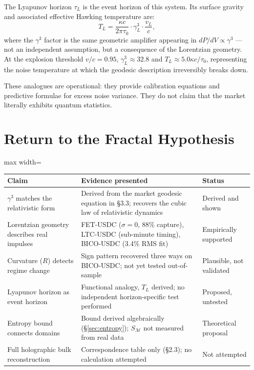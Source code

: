 \documentclass[12pt,a4paper]{article}
\begin{document}
The Lyapunov horizon $\tau_L$ is the event horizon of this system. Its
surface gravity and associated effective Hawking temperature are:
\begin{equation}
    T_L = \frac{\kappa c}{2\pi\tau_0}\cdot\gamma_L^3\cdot\frac{v_L}{c},
\end{equation}
where the $\gamma^3$ factor is the same geometric amplifier appearing in
$dP/dV\propto\gamma^3$ --- not an independent assumption, but a
consequence of the Lorentzian geometry. At the explosion threshold
$v/c=0.95$, $\gamma_L^3\approx32.8$ and $T_L\approx5.0\kappa c/\tau_0$,
representing the noise temperature at which the geodesic description
irreversibly breaks down.

These analogues are operational: they provide calibration equations and
predictive formulae for excess noise variance. They do not claim that
the market literally exhibits quantum statistics.


\section{Return to the Fractal Hypothesis}

\begin{center}
\begin{adjustbox}{max width=\textwidth}
\begin{tabular}{p{3.5cm}p{5.5cm}p{3.5cm}}
\toprule
Claim & Evidence presented & Status \\
\midrule
$\gamma^3$ matches the relativistic form &
  Derived from the market geodesic equation in \S3.3;
  recovers the cubic law of relativistic dynamics &
  Derived and shown \\
Lorentzian geometry describes real impulses &
  FET-USDC ($\sigma=0$, 88\% capture),
  LTC-USDC (sub-minute timing),
  BICO-USDC (3.4\% RMS fit) &
  Empirically supported \\
Curvature ($R$) detects regime change &
  Sign pattern recovered three ways on BICO-USDC;
  not yet tested out-of-sample &
  Plausible, not validated \\
Lyapunov horizon as event horizon &
  Functional analogy, $T_L$ derived;
  no independent horizon-specific test performed &
  Proposed, untested \\
Entropy bound connects domains &
  Bound derived algebraically (\S\ref{sec:entropy});
  $S_{\mathcal{M}}$ not measured from real data &
  Theoretical proposal \\
Full holographic bulk reconstruction &
  Correspondence table only (\S2.3);
  no calculation attempted &
  Not attempted \\
\bottomrule
\end{tabular}
\end{adjustbox}
\end{center}
\end{document}

